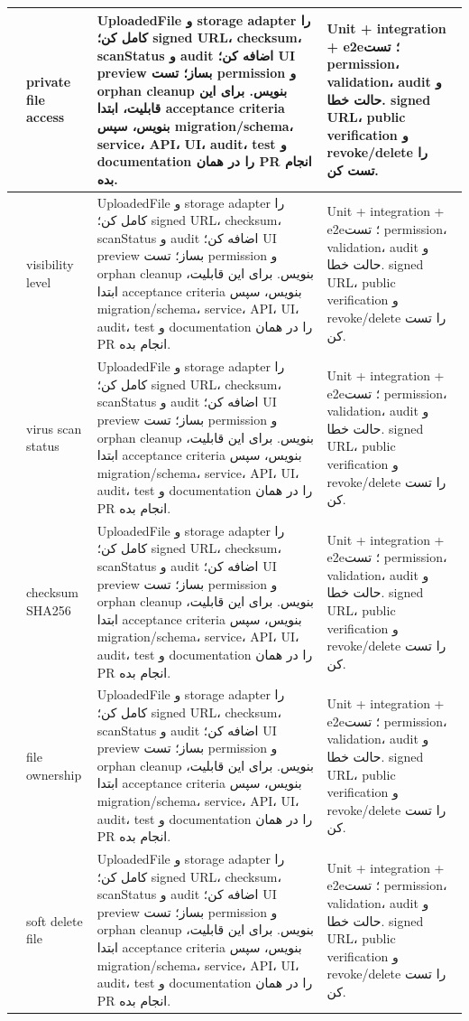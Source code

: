 \documentclass[11pt,a4paper]{article}
\begin{document}
\begin{longtable}{|>{\raggedleft\arraybackslash}p{}|>{\raggedleft\arraybackslash}p{}|>{\raggedleft\arraybackslash}p{}|>{\raggedleft\arraybackslash}p{}|}
226 & private file access & UploadedFile و storage adapter را کامل کن؛ signed URL، checksum، scanStatus و audit اضافه کن؛ UI preview بساز؛ تست permission و orphan cleanup بنویس. برای این قابلیت، ابتدا acceptance criteria بنویس، سپس migration/schema، service، API، UI، audit، test و documentation را در همان PR انجام بده. & Unit + integration + e2e؛ تست permission، validation، audit و حالت خطا. signed URL، public verification و revoke/delete را تست کن. \\ \hline
227 & visibility level & UploadedFile و storage adapter را کامل کن؛ signed URL، checksum، scanStatus و audit اضافه کن؛ UI preview بساز؛ تست permission و orphan cleanup بنویس. برای این قابلیت، ابتدا acceptance criteria بنویس، سپس migration/schema، service، API، UI، audit، test و documentation را در همان PR انجام بده. & Unit + integration + e2e؛ تست permission، validation، audit و حالت خطا. signed URL، public verification و revoke/delete را تست کن. \\ \hline
228 & virus scan status & UploadedFile و storage adapter را کامل کن؛ signed URL، checksum، scanStatus و audit اضافه کن؛ UI preview بساز؛ تست permission و orphan cleanup بنویس. برای این قابلیت، ابتدا acceptance criteria بنویس، سپس migration/schema، service، API، UI، audit، test و documentation را در همان PR انجام بده. & Unit + integration + e2e؛ تست permission، validation، audit و حالت خطا. signed URL، public verification و revoke/delete را تست کن. \\ \hline
229 & checksum SHA256 & UploadedFile و storage adapter را کامل کن؛ signed URL، checksum، scanStatus و audit اضافه کن؛ UI preview بساز؛ تست permission و orphan cleanup بنویس. برای این قابلیت، ابتدا acceptance criteria بنویس، سپس migration/schema، service، API، UI، audit، test و documentation را در همان PR انجام بده. & Unit + integration + e2e؛ تست permission، validation، audit و حالت خطا. signed URL، public verification و revoke/delete را تست کن. \\ \hline
230 & file ownership & UploadedFile و storage adapter را کامل کن؛ signed URL، checksum، scanStatus و audit اضافه کن؛ UI preview بساز؛ تست permission و orphan cleanup بنویس. برای این قابلیت، ابتدا acceptance criteria بنویس، سپس migration/schema، service، API، UI، audit، test و documentation را در همان PR انجام بده. & Unit + integration + e2e؛ تست permission، validation، audit و حالت خطا. signed URL، public verification و revoke/delete را تست کن. \\ \hline
231 & soft delete file & UploadedFile و storage adapter را کامل کن؛ signed URL، checksum، scanStatus و audit اضافه کن؛ UI preview بساز؛ تست permission و orphan cleanup بنویس. برای این قابلیت، ابتدا acceptance criteria بنویس، سپس migration/schema، service، API، UI، audit، test و documentation را در همان PR انجام بده. & Unit + integration + e2e؛ تست permission، validation، audit و حالت خطا. signed URL، public verification و revoke/delete را تست کن. \\ \hline

\end{longtable}
\end{document}
